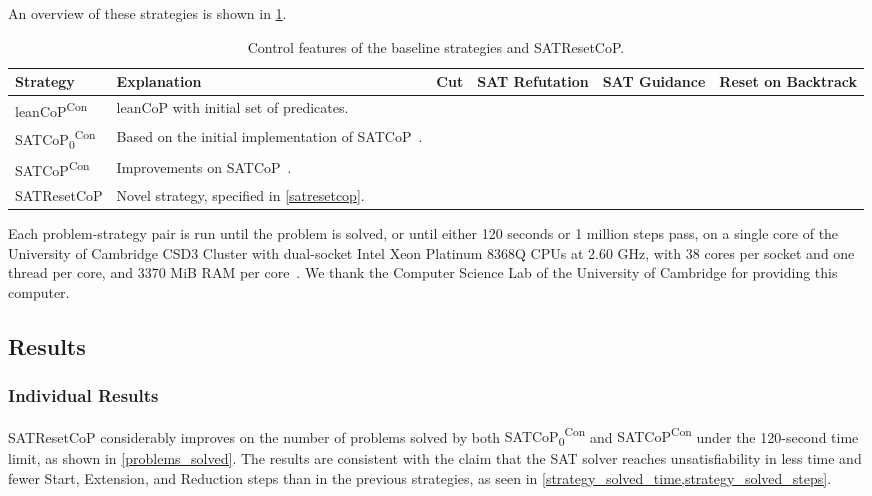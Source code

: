 \documentclass{EasyChair3.5/easychair}
\newcommand{\step}[1]{\textsf{#1}}
\newcommand{\cop}[1]{\textsf{#1}}
\newcommand{\leancopc}{\cop{leanCoP\textsuperscript{Con}}}
\newcommand{\satcopzc}{\cop{SATCoP\textsubscript{0}\textsuperscript{Con}}}
\newcommand{\satcopc}{\cop{SATCoP\textsuperscript{Con}}}
\begin{document}
An overview of these strategies is shown in \cref{cops_table}.

\begin{table}[h]
	\centering
	\footnotesize
	\begin{tabularx}{\textwidth}{>{\sffamily}l X c c c c}
		\toprule
			Strategy & Explanation & Cut & SAT Refutation & SAT Guidance & Reset on Backtrack \\
		\midrule
			\leancopc{} & \cop{leanCoP} with initial set of predicates. & \checkmark{} & & & \\
		\addlinespace[1em]
			\satcopzc{} & Based on the initial implementation of \cop{SATCoP}~\cite{satcop}. & \checkmark{} & \checkmark{} & & \\
		\addlinespace[3pt]
			\satcopc{} & Improvements on \cop{SATCoP}~\cite[\S~9.1]{satcop}. & \checkmark{} & \checkmark{} & \checkmark{} & \\
		\addlinespace[1em]
			\cop{SATResetCoP} & Novel strategy, specified in \cref{satresetcop}. & \checkmark{} & \checkmark{} & \checkmark{} & \checkmark{} \\
		\bottomrule
	\end{tabularx}
	\caption{Control features of the baseline strategies and \cop{SATResetCoP}.}
	\label{cops_table}
\end{table}

Each problem-strategy pair is run until the problem is solved, or until either 120 seconds or 1 million steps pass, on a single core of the University of Cambridge CSD3 Cluster with dual-socket Intel Xeon Platinum 8368Q CPUs at 2.60 GHz, with 38 cores per socket and one thread per core, and 3370 MiB RAM per core~\cite{cambridge_csd3}.
We thank the Computer Science Lab of the University of Cambridge for providing this computer.

\subsection{Results}

\subsubsection{Individual Results}

\cop{SATResetCoP} considerably improves on the number of problems solved by both \satcopzc{} and \satcopc{} under the 120-second time limit, as shown in \cref{problems_solved}.
The results are consistent with the claim that the SAT solver reaches unsatisfiability in less time and fewer \step{Start}, \step{Extension}, and \step{Reduction} steps than in the previous strategies, as seen in \cref{strategy_solved_time,strategy_solved_steps}.
\end{document}

